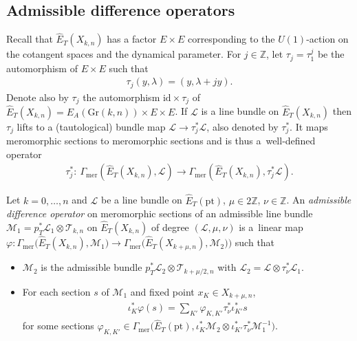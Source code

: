 \documentclass[pdftex]{sigma}
\numberwithin{equation}{section}
\begin{document}
\subsection{Admissible difference operators}
Recall that $\hat E_T(X_{k,n})$ has a factor $E\times E$ corresponding to the $U(1)$-action on the cotangent spaces and the dynamical parameter. For $j\in\mathbb Z$, let $\tau_j=\tau_1^j$ be the automorphism of $E\times E$ such that
\begin{gather*} \tau_j(y,\lambda)=(y,\lambda+jy).
\end{gather*} Denote also by $\tau_j$ the automorphism $\mathrm{id}\times \tau_j$ of $\hat E_T(X_{k,n})=E_A(\mathrm{Gr}(k,n))\times E\times E$. If $\mathcal L$ is a line bundle on $\hat E_T(X_{k,n})$ then $\tau_j$ lifts to a (tautological) bundle map $\mathcal L\to \tau_j^*\mathcal L$, also denoted by $\tau_j^*$. It maps meromorphic sections to meromorphic sections and is thus a~well-defined operator
\begin{gather*}
 \tau^*_j\colon \ \Gamma_{\mathrm{mer}}(\hat E_T(X_{k,n}),\mathcal L)\to\Gamma_{\mathrm{mer}}(\hat E_T(X_{k,n}),\tau^*_j\mathcal L).
\end{gather*}
\begin{Definition}\label{def-adm1} Let $k=0,\dots,n$ and $\mathcal L$ be a line bundle on $\hat E_T(\mathrm{pt})$, $\mu\in 2\mathbb Z$, $\nu\in\mathbb Z$. An {\em admissible difference operator} on meromorphic sections of an
admissible line bundle $\mathcal M_1=p_T^*\mathcal L_1\otimes \mathcal T_{k,n}$ on $\hat E_T(X_{k,n})$ of degree $(\mathcal L,\mu,\nu)$ is a~linear map $\varphi\colon\Gamma_{\mathrm{mer}}\big(\hat E_T(X_{k,n}), \mathcal M_1\big)\to \Gamma_{\mathrm{mer}}\big(\hat E_T(X_{k+\mu,n}),\mathcal M_2)\big)$ such that
 \begin{itemize}\itemsep=0pt
 \item[(i)] $\mathcal M_2$ is the admissible bundle $p_T^*\mathcal L_2\otimes \mathcal T_{k+\mu/2,n}$ with $\mathcal L_2=\mathcal L\otimes \tau_\nu^*\mathcal L_1$.
 \item[(ii)] For each section $s$ of $\mathcal M_1$ and fixed point
 $x_K\in X_{k+\mu,n}$,
 \begin{gather}\label{e-do}
 \iota_K^*\varphi(s)=\sum_{K'}\varphi_{K,K'}\tau_{\nu}^*\iota_{K'}^*s
 \end{gather}
 for some sections $\varphi_{K,K'}\in\Gamma_{\mathrm{mer}}\big(\hat E_T(\mathrm{pt}),\iota^*_K\mathcal M_2\otimes\iota^*_{K'}\tau^*_\nu \mathcal M_1^{-1}\big)$.
 \end{itemize}
\end{Definition}
\end{document}
